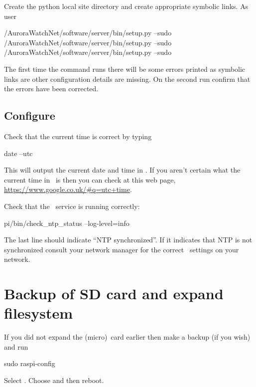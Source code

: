 Create the python local site directory and create appropriate symbolic
links. As user \piUser
\begin{Cmd}
\mytilde/AuroraWatchNet/software/server/bin/setup.py --sudo
\mytilde/AuroraWatchNet/software/server/bin/setup.py --sudo
\mytilde/AuroraWatchNet/software/server/bin/setup.py --sudo
\end{Cmd}

The first time the command runs there will be some errors printed as
symbolic links are other configuration details are missing. On the
second run confirm that the errors have been corrected.



\subsection{Configure \protect{}}
Check that the current time is correct by typing
\begin{Cmd}
date --utc
\end{Cmd}
This will output the current date and time in \utc. If you aren't
certain what the current time in \utc\ is then you can check at this
web page, \url{https://www.google.co.uk/#q=utc+time}.

Check that the \ntp\ service is running correctly:
\begin{Cmd}
\mytilde{}pi/bin/check_ntp_status --log-level=info
\end{Cmd}
The last line should indicate ``NTP synchronized''. If it indicates
that NTP is not synchronized consult your network manager for the
correct \ntp\ settings on your network.



\section{Backup of SD card and expand filesystem}

If you did not expand the (micro)\sd\ card earlier then make a backup
(if you wish) and run
\begin{Cmd}
sudo raspi-config
\end{Cmd}
Select . Choose  and then reboot.
